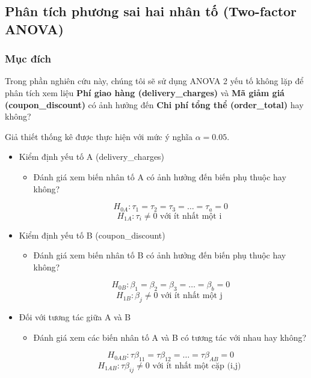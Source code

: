
\subsection{Phân tích phương sai hai nhân tố (Two-factor ANOVA)}
\subsubsection{Mục đích}
Trong phần nghiên cứu này, chúng tôi sẽ sử dụng ANOVA 2 yếu tố không lặp để phân tích xem liệu \textbf{Phí giao hàng (delivery\_charges)} và \textbf{Mã giảm giá  (coupon\_discount)} có ảnh hưởng đến \textbf{Chi phí tổng thể (order\_total)} hay không?

Giả thiết thống kê được thực hiện với mức ý nghĩa $\alpha = 0.05$.


\begin{itemize}
    
    \item Kiểm định yếu tố A (delivery\_charges)
    \begin{itemize}
        \item Đánh giá xem biến nhân tố A có ảnh hưởng đến biến phụ thuộc hay không?
        
        \[
            H_{0A}: \tau_{1} = \tau_{2} = \tau_{3} = \dots = \tau_{a} = 0
            \]
            \[
            H_{1A}: \tau_{i} \neq  0 \text{ với ít nhất một i }
            \]
    \end{itemize}
    
    \item Kiểm định yếu tố B (coupon\_discount)
    \begin{itemize}
        \item Đánh giá xem biến nhân tố B có ảnh hưởng đến biến phụ thuộc hay không?
        
        \[
            H_{0B}: \beta_{1} = \beta_{2} = \beta_{3} = \dots = \beta_{b} = 0
            \]
            \[
            H_{1B}: \beta_{j} \neq  0 \text{ với ít nhất một j }
            \]
    \end{itemize}
    \item Đối với tương tác giữa A và B  
    \begin{itemize}
        \item Đánh giá xem các biến nhân tố A và B có tương tác với nhau hay không?
        
        \[
            H_{0AB}: \tau\beta_{11} = \tau\beta_{12}  = \dots = \tau\beta_{AB} = 0 
            \]
            \[
            H_{1AB}: \tau\beta_{ij} \neq  0 \text{ với ít nhất một cặp (i,j) }
            \]
    \end{itemize}
\end{itemize}
